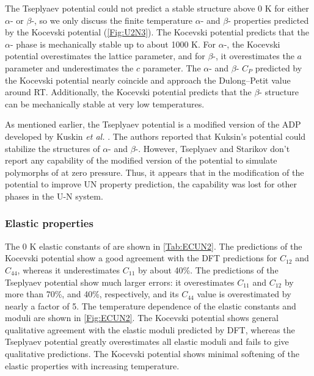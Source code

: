 \documentclass[preprint, 12pt]{elsarticle}
\begin{document}
The Tseplyaev potential could not predict a stable structure above 0 K for either $\alpha$- or $\beta$-, so we only discuss the finite temperature $\alpha$- and $\beta$- properties predicted by the Kocevski potential (\cref{Fig:U2N3}). The Kocevski potential predicts that the $\alpha$- phase is mechanically stable up to about 1000 K. For $\alpha$-, the Kocevski potential overestimates the lattice parameter, and for $\beta$-, it overestimates the $a$ parameter and underestimates the $c$ parameter. The $\alpha$- and $\beta$- $C_P$ predicted by the Kocevski potential nearly coincide and approach the Dulong–Petit value around RT. Additionally, the Kocevski potential predicts that the $\beta$- structure can be mechanically stable at very low temperatures.

As mentioned earlier, the Tseplyaev potential is a modified version of the ADP developed by Kuskin \textit{et al.} \cite{Kuksin2016}. The authors reported that Kuksin's potential could stabilize the structures of $\alpha$- and $\beta$-. However, Tseplyaev and Starikov \cite{Tseplyaev2016} don't report any capability of the modified version of the potential to simulate polymorphs of  at zero pressure. Thus, it appears that in the modification of the potential to improve UN property prediction, the capability was lost for other phases in the U-N system.



\subsubsection{Elastic properties}

The 0 K elastic constants of  are shown in \cref{Tab:ECUN2}. The predictions of the Kocevski potential show a good agreement with the DFT predictions for $C_{12}$ and $C_{44}$, whereas it underestimates $C_{11}$ by about 40\%. The predictions of the Tseplyaev potential show much larger errors: it overestimates $C_{11}$ and $C_{12}$ by more than 70\%, and 40\%, respectively, and its $C_{44}$ value is overestimated by nearly a factor of 5. The temperature dependence of the  elastic constants and moduli are shown in \cref{Fig:ECUN2}. The Kocevski potential shows general qualitative agreement with the  elastic moduli predicted by DFT, whereas the Tseplyaev potential greatly overestimates all elastic moduli and fails to give qualitative predictions. The Kocevski potential shows minimal softening of the  elastic properties with increasing temperature.
\end{document}
